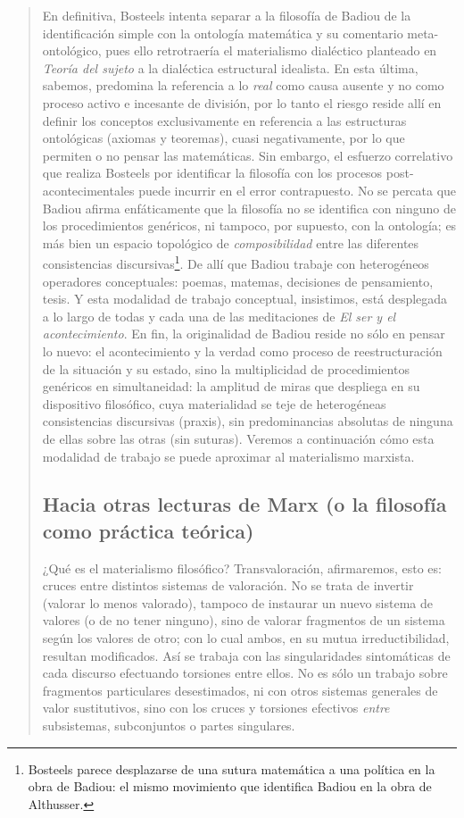 \begin{quote}
En definitiva, Bosteels intenta separar a la filosofía de Badiou de la identificación simple con la ontología matemática y su comentario meta-ontológico, pues ello  retrotraería el materialismo dialéctico planteado en \emph{Teoría del sujeto} a la dialéctica estructural idealista. En esta última, sabemos, predomina la referencia a lo \emph{real} como causa ausente y no como proceso activo e incesante de división, por lo tanto el riesgo reside allí en definir los conceptos exclusivamente en referencia a las estructuras ontológicas (axiomas y teoremas), cuasi negativamente, por lo que permiten o no pensar las matemáticas. Sin embargo, el esfuerzo correlativo que realiza Bosteels por identificar la filosofía con los procesos post-acontecimentales puede incurrir en el error contrapuesto. No se percata que Badiou afirma enfáticamente que la filosofía no se identifica con ninguno de los procedimientos genéricos, ni tampoco, por supuesto, con la ontología; es más bien un espacio topológico de \emph{composibilidad} entre las diferentes consistencias discursivas\footnote{Bosteels parece desplazarse de una sutura matemática a una política en la obra de Badiou: el mismo movimiento que identifica Badiou en la obra de Althusser.}. De allí que Badiou trabaje con heterogéneos operadores conceptuales: poemas, matemas, decisiones de pensamiento, tesis. Y esta modalidad de trabajo conceptual, insistimos, está desplegada a lo largo de todas y cada una de las meditaciones de \emph{El ser y el acontecimiento}. En fin, la originalidad de Badiou reside no sólo en pensar lo nuevo: el acontecimiento y la verdad como proceso de reestructuración de la situación y su estado, sino la multiplicidad de procedimientos genéricos en simultaneidad: la amplitud de miras que despliega en su dispositivo filosófico, cuya materialidad se teje de heterogéneas consistencias discursivas (praxis), sin predominancias absolutas de ninguna de ellas sobre las otras (sin suturas). Veremos a continuación cómo esta modalidad de trabajo se puede aproximar al materialismo marxista.

\subsection{Hacia otras lecturas de Marx (o la filosofía como práctica teórica)}

¿Qué es el materialismo filosófico? Transvaloración, afirmaremos, esto es: cruces entre distintos sistemas de valoración. No se trata de invertir (valorar lo menos valorado), tampoco de instaurar un nuevo sistema de valores (o de no tener ninguno), sino de valorar fragmentos de un sistema según los valores de otro; con lo cual ambos, en su mutua irreductibilidad, resultan modificados. Así se trabaja con las singularidades sintomáticas de cada discurso efectuando torsiones entre ellos. No es sólo un trabajo sobre fragmentos particulares desestimados, ni con otros sistemas generales de valor sustitutivos, sino con los cruces y torsiones efectivos \emph{entre} subsistemas, subconjuntos o partes singulares.


\end{quote}
